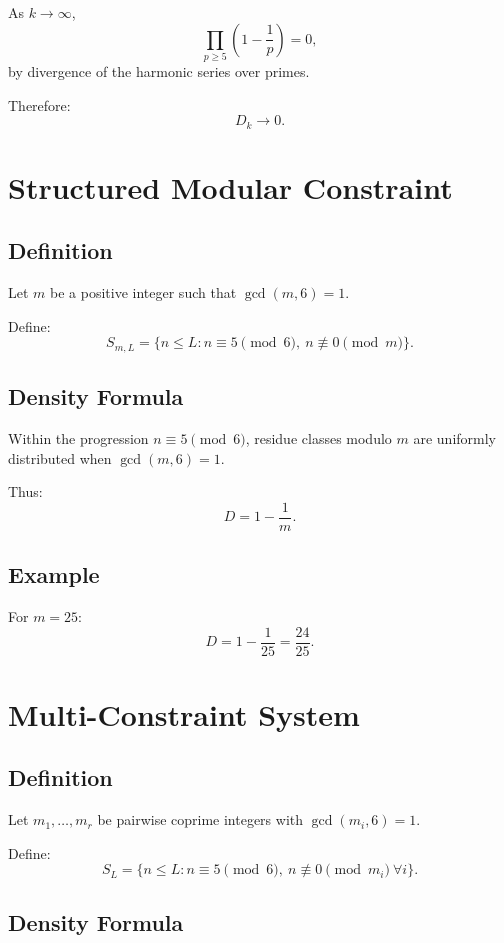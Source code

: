 \documentclass[11pt]{article}
\begin{document}
As $k \to \infty$,
\[
\prod_{p \geq 5} \left(1 - \frac{1}{p}\right) = 0,
\]
by divergence of the harmonic series over primes.

Therefore:
\[
D_k \to 0.
\]

\section{Structured Modular Constraint}

\subsection{Definition}

Let $m$ be a positive integer such that $\gcd(m,6)=1$.

Define:
\[
S_{m,L} = \{ n \leq L : n \equiv 5 \pmod{6}, \ n \not\equiv 0 \pmod{m} \}.
\]

\subsection{Density Formula}

Within the progression $n \equiv 5 \pmod{6}$, residue classes modulo $m$ are uniformly distributed when $\gcd(m,6)=1$.

Thus:
\[
D = 1 - \frac{1}{m}.
\]

\subsection{Example}

For $m = 25$:
\[
D = 1 - \frac{1}{25} = \frac{24}{25}.
\]

\section{Multi-Constraint System}

\subsection{Definition}

Let $m_1, \dots, m_r$ be pairwise coprime integers with $\gcd(m_i,6)=1$.

Define:
\[
S_{L} = \{ n \leq L : n \equiv 5 \pmod{6}, \ n \not\equiv 0 \pmod{m_i} \ \forall i \}.
\]

\subsection{Density Formula}
\end{document}
